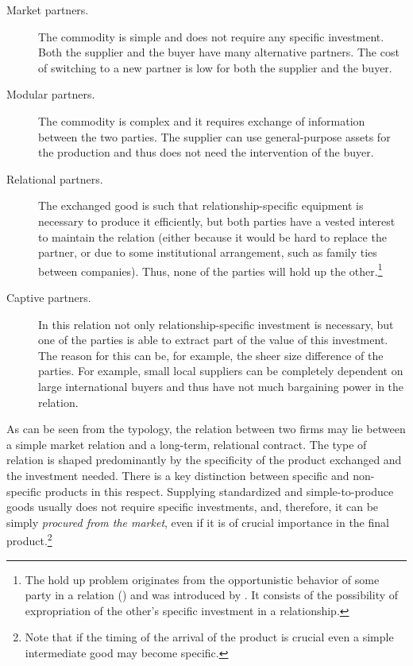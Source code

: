 \documentclass[final, dvipsnames, authoryear,12pt]{elsarticle}
\begin{document}
\begin{description}
    \item[Market partners.] The commodity is simple and does not require any specific investment. Both the supplier and the buyer have many alternative partners. The cost of switching to a new partner is low for both the supplier and the buyer.
    \item[Modular partners.] The commodity is complex and it requires exchange of information between the two parties. The supplier can use general-purpose assets for the production and thus does not need the intervention of the buyer.
    \item[Relational partners.] The exchanged good is such that relationship-specific equipment is necessary to produce it efficiently, but both parties have a vested interest to maintain the relation (either because it would be hard to replace the partner, or due to some institutional arrangement, such as family ties between companies). Thus, none of the parties will hold up the other.\footnote{The hold up problem originates from the opportunistic behavior of some party in a relation (\cite{williamson2007economic}) and was introduced by \cite{grossman1986costs}. It consists of the possibility of expropriation of the other's specific investment in a relationship.}
    \item[Captive partners.] In this relation not only relationship-specific investment is necessary, but one of the parties is able to extract part of the value of this investment. The reason for this can be, for example, the sheer size difference of the parties. For example, small local suppliers can be completely dependent on large international buyers and thus have not much bargaining power in the relation.
\end{description}

As can be seen from the typology, the relation between two firms may lie between a simple market relation and a long-term, relational contract. The type of relation is shaped predominantly by the specificity of the product exchanged and the investment needed. There is a key distinction between specific and non-specific products in this respect. Supplying standardized and simple-to-produce goods usually does not require specific investments, and, therefore, it can be simply \textit{procured from the market}, even if it is of crucial importance in the final product.\footnote{Note that if the timing of the arrival of the product is crucial even a simple intermediate good may become specific.} 
\end{document}
